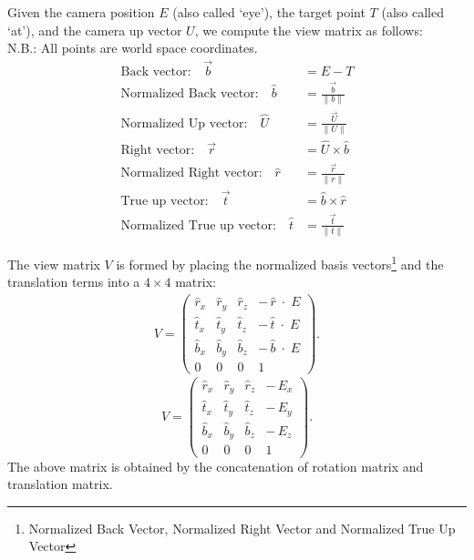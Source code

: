 Given the camera position $E$ (also called `eye'), the target point $T$ (also called `at'), and the camera up vector $U$, we compute the view matrix as follows: \\
N.B.: All points are world space coordinates.\\

\begin{equation}
\begin{aligned}
\text{Back vector:}\quad \vec{b} &= E - T \\
\text{Normalized Back vector:}\quad \hat{b} &= \frac{\vec{b}}{\|b\|} \\
\text{Normalized Up vector:}\quad \hat{U} &= \frac{\vec{U}}{\|U\|} \\
\text{Right vector:}\quad \vec{r} &= \hat{U} \times \hat{b} \\
\text{Normalized Right vector:}\quad  \hat{r} &= \frac{\vec{r}}{\|r\|} \\
\text{True up vector:}\quad \vec{t} &= \hat{b} \times \hat{r}\\
\text{Normalized True up vector:}\quad  \hat{t} &= \frac{\vec{t}}{\|t\|} 
\end{aligned}
\end{equation}

The view matrix $V$ is formed by placing the normalized basis vectors\footnote{Normalized Back Vector, Normalized Right Vector and Normalized True Up Vector} and the translation terms into a $4\times 4$ matrix:
\begin{align*}
V =
\begin{pmatrix}
\hat{r}_x & \hat{r}_y & \hat{r}_z & -\,\hat{r}\;\cdot\;E \\
\hat{t}_x & \hat{t}_y & \hat{t}_z & -\,\hat{t}\;\cdot\;E \\
\hat{b}_x & \hat{b}_y & \hat{b}_z & -\,\hat{b}\;\cdot\;E\\
0         & 0         & 0         & 1
\end{pmatrix}.
\end{align*}
\begin{equation}
V =
\begin{pmatrix}
\hat{r}_x & \hat{r}_y & \hat{r}_z & -\,E_x \\
\hat{t}_x & \hat{t}_y & \hat{t}_z & -\,E_y \\
\hat{b}_x & \hat{b}_y & \hat{b}_z & -\,E_z\\
0         & 0         & 0         & 1
\end{pmatrix}.
\end{equation}
The above matrix is obtained by the concatenation of rotation matrix and translation matrix. 

